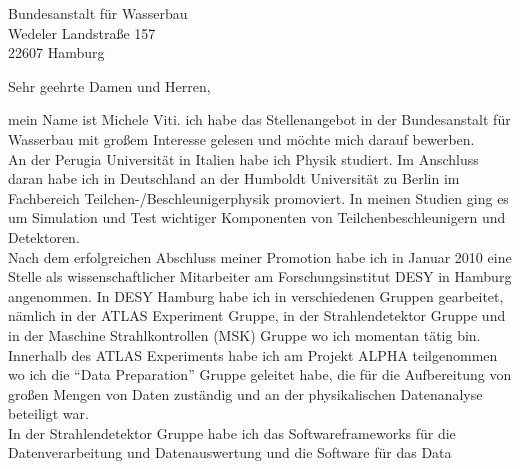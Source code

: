 \documentclass[ebner,paper=a4,fontsize=11pt,ngerman,BCOR=10mm]{scrlttr2}%
\begin{document}
\pagestyle{empty}

\begin{letter}{Bundesanstalt f\"ur Wasserbau\\
Wedeler Landstra{\ss}e 157\\ 
22607 Hamburg}


\setlength{\parindent}{15pt}

\opening{Sehr geehrte Damen und Herren,} 

mein Name ist Michele Viti. ich habe das Stellenangebot in der Bundesanstalt
f{\"u}r Wasserbau mit gro{\ss}em Interesse gelesen und m{\"o}chte mich darauf
bewerben. \\
% 
% 
% 
\indent An der Perugia Universit\"at in Italien habe ich Physik studiert. Im
Anschluss daran habe ich in Deutschland an der Humboldt Universit\"at
zu Berlin im Fachbereich Teilchen-/Beschleunigerphysik promoviert. In
meinen Studien ging es um Simulation und Test wichtiger
Komponenten von Teilchenbeschleunigern und Detektoren.\\
\indent Nach dem erfolgreichen Abschluss meiner Promotion habe ich in Januar
2010 eine Stelle als wissenschaftlicher Mitarbeiter am Forschungsinstitut DESY
in Hamburg angenommen. In DESY Hamburg habe ich in verschiedenen Gruppen
gearbeitet, n{\"a}mlich in der ATLAS Experiment Gruppe, in der Strahlendetektor
Gruppe und in der Maschine Strahlkontrollen (MSK) Gruppe wo ich momentan
t{\"a}tig bin. \\
Innerhalb des ATLAS Experiments habe ich am Projekt ALPHA teilgenommen wo
ich die "`Data Preparation"' Gruppe geleitet habe, die f{\"u}r die Aufbereitung
von gro{\ss}en Mengen von Daten zust{\"a}ndig und an der physikalischen
Datenanalyse beteiligt war.\\
In der Strahlendetektor Gruppe habe ich das Softwareframeworks f\"ur die
Datenverarbeitung und Datenauswertung und die Software f{\"u}r das Data

\end{letter}
\end{document}

